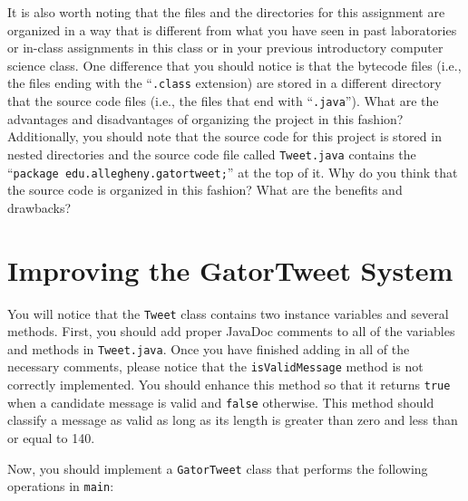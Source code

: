   It is also worth noting that the files and the directories for this assignment are organized in a way that is
  different from what you have seen in past laboratories or in-class assignments in this class or in your previous
  introductory computer science class. One difference that you should notice is that the bytecode files (i.e., the files
    ending with the ``{\tt .class} extension) are stored in a different directory that the source code files (i.e., the
  files that end with ``{\tt .java}''). What are the advantages and disadvantages of organizing the project in this
  fashion? Additionally, you should note that the source code for this project is stored in nested directories and the
  source code file called {\tt Tweet.java} contains the ``{\tt package edu.allegheny.gatortweet;}'' at the top of it.
  Why do you think that the source code is organized in this fashion? What are the benefits and drawbacks?

\section*{Improving the GatorTweet System}

  You will notice that the {\tt Tweet} class contains two instance variables and several methods.  First, you should add
  proper JavaDoc comments to all of the variables and methods in {\tt Tweet.java}.  Once you have finished adding in all
  of the necessary comments, please notice that the {\tt isValidMessage} method is not correctly implemented.  You
  should enhance this method so that it returns {\tt true} when a candidate message is valid and {\tt false} otherwise.
  This method should classify a message as valid as long as its length is greater than zero and less than or equal to
  140.


  \noindent
  Now, you should implement a {\tt GatorTweet} class that performs the following operations in {\tt main}:


